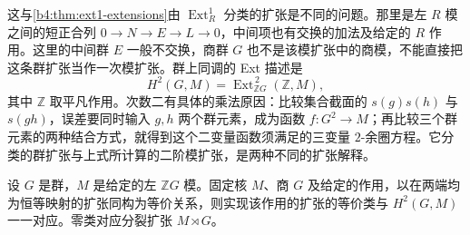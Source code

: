 \ProseParagraphBreak

这与\cref{b4:thm:ext1-extensions}由 \(\operatorname{Ext}_R^1\) 分类的扩张是不同的问题。那里是左 \(R\) 模之间的短正合列 \(0\to N\to E\to L\to0\)，中间项也有交换的加法及给定的 \(R\) 作用。这里的中间群 \(E\) 一般不交换，商群 \(G\) 也不是该模扩张中的商模，不能直接把这条群扩张当作一次模扩张。群上同调的 Ext 描述是
\[
	H^2(G,M)=\operatorname{Ext}_{\mathbb ZG}^{\,2}(\mathbb Z,M),
\]
其中 \(\mathbb Z\) 取平凡作用。次数二有具体的乘法原因：比较集合截面的 \(s(g)s(h)\) 与 \(s(gh)\)，误差要同时输入 \(g,h\) 两个群元素，成为函数 \(f:G^2\to M\)；再比较三个群元素的两种结合方式，就得到这个二变量函数须满足的三变量 \(2\)-余圈方程。它分类的群扩张与上式所计算的二阶模扩张，是两种不同的扩张解释。

\begin{theorem}[群扩张的上同调分类]\label{b4:thm:group-extensions-h2}
	设 \(G\) 是群，\(M\) 是给定的左 \(\mathbb ZG\) 模。固定核 \(M\)、商 \(G\) 及给定的作用，以在两端均为恒等映射的扩张同构为等价关系，则实现该作用的扩张的等价类与 \(H^2(G,M)\) 一一对应。零类对应分裂扩张 \(M\rtimes G\)。
\end{theorem}
